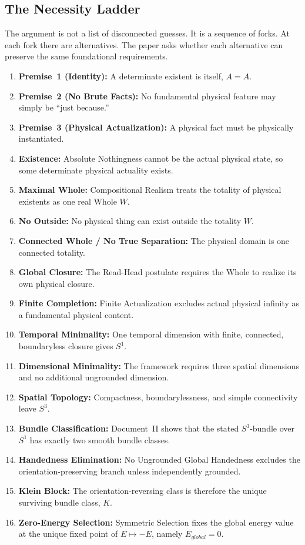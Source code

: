 \documentclass[11pt]{article}
\theoremstyle{canonstyle}
\providecommand{\Klein}{\mathcal{K}}
\providecommand{\Sone}{S^1}
\providecommand{\Sthree}{S^3}
\def\mathrm#1{#1}%
\def\mathcal#1{#1}%
\begin{document}
\subsection{The Necessity Ladder}

The argument is not a list of disconnected guesses. It is a sequence of forks. At each fork there are alternatives. The paper asks whether each alternative can preserve the same foundational requirements.

\begin{chainbox}
\begin{enumerate}
    \item \textbf{Premise~1 (Identity):} A determinate existent is itself, $A=A$.
    \item \textbf{Premise~2 (No Brute Facts):} No fundamental physical feature may simply be ``just because.''
    \item \textbf{Premise~3 (Physical Actualization):} A physical fact must be physically instantiated.
    \item \textbf{Existence:} Absolute Nothingness cannot be the actual physical state, so some determinate physical actuality exists.
    \item \textbf{Maximal Whole:} Compositional Realism treats the totality of physical existents as one real Whole $W$.
    \item \textbf{No Outside:} No physical thing can exist outside the totality $W$.
    \item \textbf{Connected Whole / No True Separation:} The physical domain is one connected totality.
    \item \textbf{Global Closure:} The Read-Head postulate requires the Whole to realize its own physical closure.
    \item \textbf{Finite Completion:} Finite Actualization excludes actual physical infinity as a fundamental physical content.
    \item \textbf{Temporal Minimality:} One temporal dimension with finite, connected, boundaryless closure gives $\Sone$.
    \item \textbf{Dimensional Minimality:} The framework requires three spatial dimensions and no additional ungrounded dimension.
    \item \textbf{Spatial Topology:} Compactness, boundarylessness, and simple connectivity leave $\Sthree$.
    \item \textbf{Bundle Classification:} Document~II shows that the stated $S^3$-bundle over $S^1$ has exactly two smooth bundle classes.
    \item \textbf{Handedness Elimination:} No Ungrounded Global Handedness excludes the orientation-preserving branch unless independently grounded.
    \item \textbf{Klein Block:} The orientation-reversing class is therefore the unique surviving bundle class, $\Klein$.
    \item \textbf{Zero-Energy Selection:} Symmetric Selection fixes the global energy value at the unique fixed point of $E \mapsto -E$, namely $E_{\mathrm{global}}=0$.
\end{enumerate}
\end{chainbox}
\end{document}
